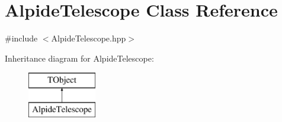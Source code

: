\hypertarget{class_alpide_telescope}{}\section{Alpide\+Telescope Class Reference}
\label{class_alpide_telescope}


{\ttfamily \#include $<$Alpide\+Telescope.\+hpp$>$}

Inheritance diagram for Alpide\+Telescope\+:\begin{figure}[H]
\begin{center}
\leavevmode
\includegraphics[height=2.000000cm]{class_alpide_telescope}
\end{center}
\end{figure}
